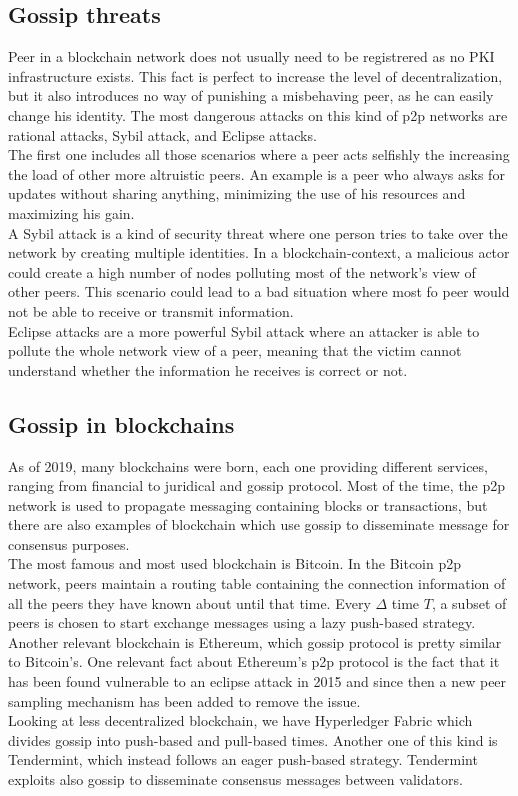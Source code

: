 \documentclass[mscthesis]{usiinfthesis}
\begin{document}
\subsection{Gossip threats}
Peer in a blockchain network does not usually need to be registrered as no PKI infrastructure exists. This fact is perfect to increase the level of decentralization, but it also introduces no way of punishing a misbehaving peer, as he can easily change his identity.
The most dangerous attacks on this kind of p2p networks are rational attacks, Sybil attack, and Eclipse attacks. \\
The first one includes all those scenarios where a peer acts selfishly the increasing the load of other more altruistic peers. An example is a peer who always asks for updates without sharing anything, minimizing the use of his resources and maximizing his gain. \\
A Sybil attack is a kind of security threat where one person tries to take over the network by creating multiple identities. In a blockchain-context, a malicious actor could create a high number of nodes polluting most of the network's view of other peers. This scenario could lead to a bad situation where most fo peer would not be able to receive or transmit information. \\
Eclipse attacks are a more powerful Sybil attack where an attacker is able to pollute the whole network view of a peer, meaning that the victim cannot understand whether the information he receives is correct or not.
\subsection{Gossip in blockchains}
As of 2019, many blockchains were born, each one providing different services, ranging from financial to juridical and gossip protocol. Most of the time, the p2p network is used to propagate messaging containing blocks or transactions, but there are also examples of blockchain which use gossip to disseminate message for consensus purposes.\\
The most famous and most used blockchain is Bitcoin. In the Bitcoin p2p network, peers maintain a routing table containing the connection information of all the peers they have known about until that time. Every $\Delta$ time $T$, a subset of peers is chosen to start exchange messages using a lazy push-based strategy. Another relevant blockchain is Ethereum, which gossip protocol is pretty similar to Bitcoin's. One relevant fact about Ethereum's p2p protocol is the fact that it has been found vulnerable to an eclipse attack in 2015 and since then a new peer sampling mechanism has been added to remove the issue. \\
Looking at less decentralized blockchain, we have Hyperledger Fabric which divides gossip into push-based and pull-based times. Another one of this kind is Tendermint, which instead follows an eager push-based strategy. Tendermint exploits also gossip to disseminate consensus messages between validators.
\end{document}
